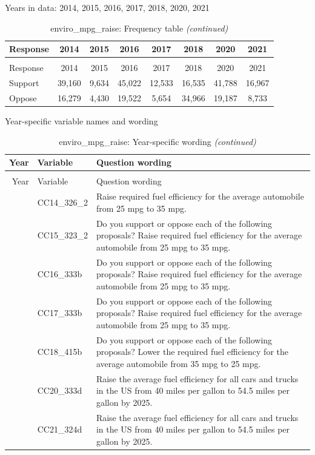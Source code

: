 \documentclass[
  12pt]{article}
\begin{document}
Years in data: 2014, 2015, 2016, 2017, 2018, 2020,
2021\begingroup\fontsize{10}{12}\selectfont

\begin{longtable}[t]{lccccccc}
\caption{\label{tab:unnamed-chunk-5}enviro\_mpg\_raise: Frequency table}\\
\toprule
Response & 2014 & 2015 & 2016 & 2017 & 2018 & 2020 & 2021\\
\midrule
\endfirsthead
\caption[]{enviro\_mpg\_raise: Frequency table \textit{(continued)}}\\
\toprule
Response & 2014 & 2015 & 2016 & 2017 & 2018 & 2020 & 2021\\
\midrule
\endhead

\endfoot
\bottomrule
\endlastfoot
Support & 39,160 & 9,634 & 45,022 & 12,533 & 16,535 & 41,788 & 16,967\\
Oppose & 16,279 & 4,430 & 19,522 & 5,654 & 34,966 & 19,187 & 8,733\\*
\end{longtable}
\endgroup{}

Year-specific variable names and
wording\begingroup\fontsize{11}{13}\selectfont

\begin{longtable}[t]{rl>{\raggedright\arraybackslash}p{10cm}}
\caption{\label{tab:unnamed-chunk-5}enviro\_mpg\_raise: Year-specific wording}\\
\toprule
Year & Variable & Question wording\\
\midrule
\endfirsthead
\caption[]{enviro\_mpg\_raise: Year-specific wording \textit{(continued)}}\\
\toprule
Year & Variable & Question wording\\
\midrule
\endhead

\endfoot
\bottomrule
\endlastfoot
2014 & CC14\_326\_2 & Raise required fuel efficiency for the average automobile from 25 mpg to 35 mpg.\\
\addlinespace
2015 & CC15\_323\_2 & Do you support or oppose each of the following proposals? Raise required fuel efficiency for the average automobile from 25 mpg to 35 mpg.\\
\addlinespace
2016 & CC16\_333b & Do you support or oppose each of the following proposals? Raise required fuel efficiency for the average automobile from 25 mpg to 35 mpg.\\
\addlinespace
2017 & CC17\_333b & Do you support or oppose each of the following proposals? Raise required fuel efficiency for the average automobile from 25 mpg to 35 mpg.\\
\addlinespace
2018 & CC18\_415b & Do you support or oppose each of the following proposals? Lower the required fuel efficiency for the average automobile from 35 mpg to 25 mpg.\\
\addlinespace
2020 & CC20\_333d & Raise the average fuel efficiency for all cars and trucks in the US from 40 miles per gallon to 54.5 miles per gallon by 2025.\\
\addlinespace
2021 & CC21\_324d & Raise the average fuel efficiency for all cars and trucks in the US from 40 miles per gallon to 54.5 miles per gallon by 2025.\\*
\end{longtable}
\endgroup{}
\end{document}

